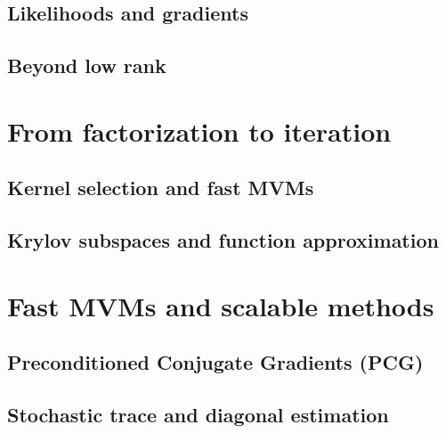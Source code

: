 \documentclass[12pt, leqno]{article} %
\begin{document}
\subsection{Likelihoods and gradients}

\subsection{Beyond low rank}

\section{From factorization to iteration}

\subsection{Kernel selection and fast MVMs}

\subsection{Krylov subspaces and function approximation}

\section{Fast MVMs and scalable methods}

\subsection{Preconditioned Conjugate Gradients (PCG)}

\subsection{Stochastic trace and diagonal estimation}
\end{document}
